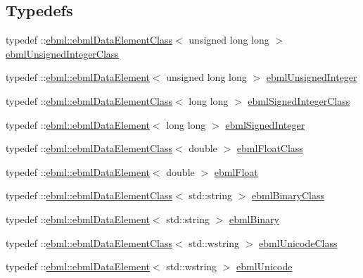 \subsection*{Typedefs}
\begin{DoxyCompactItemize}
\item 
typedef \+::\mbox{\hyperlink{classebml_1_1ebmlDataElementClass}{ebml\+::ebml\+Data\+Element\+Class}}$<$ unsigned long long $>$ \mbox{\hyperlink{namespaceebml_a506b246c5594e5d0322c3c05e9820fd2}{ebml\+Unsigned\+Integer\+Class}}
\item 
typedef \+::\mbox{\hyperlink{classebml_1_1ebmlDataElement}{ebml\+::ebml\+Data\+Element}}$<$ unsigned long long $>$ \mbox{\hyperlink{namespaceebml_a094d15ef60da5dd0e74a4e379ac3e547}{ebml\+Unsigned\+Integer}}
\item 
typedef \+::\mbox{\hyperlink{classebml_1_1ebmlDataElementClass}{ebml\+::ebml\+Data\+Element\+Class}}$<$ long long $>$ \mbox{\hyperlink{namespaceebml_a344220b1a75e640887ea0d280f2349af}{ebml\+Signed\+Integer\+Class}}
\item 
typedef \+::\mbox{\hyperlink{classebml_1_1ebmlDataElement}{ebml\+::ebml\+Data\+Element}}$<$ long long $>$ \mbox{\hyperlink{namespaceebml_a5429f4885c9e4e9eeda85b245ea6166a}{ebml\+Signed\+Integer}}
\item 
typedef \+::\mbox{\hyperlink{classebml_1_1ebmlDataElementClass}{ebml\+::ebml\+Data\+Element\+Class}}$<$ double $>$ \mbox{\hyperlink{namespaceebml_a2e365f10ba5435bdd5c1fd909a601f31}{ebml\+Float\+Class}}
\item 
typedef \+::\mbox{\hyperlink{classebml_1_1ebmlDataElement}{ebml\+::ebml\+Data\+Element}}$<$ double $>$ \mbox{\hyperlink{namespaceebml_af998fa3b620e1bb7363e1426c9910b9c}{ebml\+Float}}
\item 
typedef \+::\mbox{\hyperlink{classebml_1_1ebmlDataElementClass}{ebml\+::ebml\+Data\+Element\+Class}}$<$ std\+::string $>$ \mbox{\hyperlink{namespaceebml_a4fe139b904ac34f0e3036c9451b4b18b}{ebml\+Binary\+Class}}
\item 
typedef \+::\mbox{\hyperlink{classebml_1_1ebmlDataElement}{ebml\+::ebml\+Data\+Element}}$<$ std\+::string $>$ \mbox{\hyperlink{namespaceebml_a9b2775bff9ce97bc09b955ca1de557ae}{ebml\+Binary}}
\item 
typedef \+::\mbox{\hyperlink{classebml_1_1ebmlDataElementClass}{ebml\+::ebml\+Data\+Element\+Class}}$<$ std\+::wstring $>$ \mbox{\hyperlink{namespaceebml_acdb74e752b77d5b4a4c445684db86832}{ebml\+Unicode\+Class}}
\item 
typedef \+::\mbox{\hyperlink{classebml_1_1ebmlDataElement}{ebml\+::ebml\+Data\+Element}}$<$ std\+::wstring $>$ \mbox{\hyperlink{namespaceebml_abd9662588801df32dd1d2853a9f2f9b1}{ebml\+Unicode}}

\end{DoxyCompactItemize}
